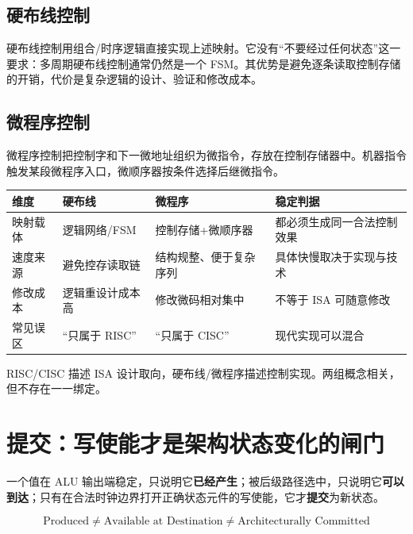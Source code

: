 \documentclass[UTF8,fontset=fandol,11pt,a4paper]{ctexart}
\newcommand{\kw}[1]{\textbf{\color{deep}#1}}
\begin{document}
\subsection{硬布线控制}

硬布线控制用组合/时序逻辑直接实现上述映射。它没有“不要经过任何状态”这一要求：多周期硬布线控制通常仍然是一个 FSM。其优势是避免逐条读取控制存储的开销，代价是复杂逻辑的设计、验证和修改成本。

\subsection{微程序控制}

微程序控制把控制字和下一微地址组织为微指令，存放在控制存储器中。机器指令触发某段微程序入口，微顺序器按条件选择后继微指令。

\begin{center}

\end{center}

\begin{center}
\small
\begin{tabularx}{\linewidth}{L{2.2cm}YYL{3.5cm}}
\toprule
维度 & 硬布线 & 微程序 & 稳定判据 \\
\midrule
映射载体 & 逻辑网络/FSM & 控制存储+微顺序器 & 都必须生成同一合法控制效果 \\
速度来源 & 避免控存读取链 & 结构规整、便于复杂序列 & 具体快慢取决于实现与技术 \\
修改成本 & 逻辑重设计成本高 & 修改微码相对集中 & 不等于 ISA 可随意修改 \\
常见误区 & “只属于 RISC” & “只属于 CISC” & 现代实现可以混合 \\
\bottomrule
\end{tabularx}
\end{center}

RISC/CISC 描述 ISA 设计取向，硬布线/微程序描述控制实现。两组概念相关，但不存在一一绑定。

\section{提交：写使能才是架构状态变化的闸门}

一个值在 ALU 输出端稳定，只说明它\kw{已经产生}；被后级路径选中，只说明它\kw{可以到达}；只有在合法时钟边界打开正确状态元件的写使能，它才\kw{提交}为新状态。

\[
\boxed{
\text{Produced}
\neq
\text{Available at Destination}
\neq
\text{Architecturally Committed}
}
\]
\end{document}
